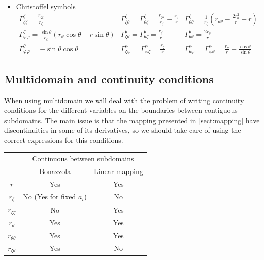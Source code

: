 \begin{itemize}
\begin{itemize}
\begin{equation}
\begin{array}{l}
\end{array}
\end{equation}
\end{itemize}
\item Christoffel symbols
\begin{equation}
\begin{array}{lll}
\displaystyle
\Gamma^{\zeta}_{\zeta\zeta}=\frac{r_{\zeta\zeta}}{r_\zeta}&
\displaystyle
\Gamma^{\zeta}_{\zeta\theta}=\Gamma^{\zeta}_{\theta\zeta}=
\frac{r_{\zeta\theta}}{r_\zeta}-\frac{r_\theta}{r}&
\displaystyle
\Gamma^{\zeta}_{\theta\theta}=\frac{1}{r_\zeta}\left(r_{\theta\theta}-
\frac{2r_\theta^2}{r}-r\right)\\
\displaystyle
\Gamma^{\zeta}_{\varphi\varphi}=\frac{\sin\theta}{r_\zeta}(r_\theta\cos\theta
-r\sin\theta)&
\displaystyle
\Gamma^{\theta}_{\zeta\theta}=\Gamma^{\theta}_{\theta\zeta}=\frac{r_\zeta}{r}&
\displaystyle
\Gamma^{\theta}_{\theta\theta}=\frac{2r_{\theta}}{r}\\
\displaystyle
\Gamma^{\theta}_{\varphi\varphi}=-\sin\theta\cos\theta&
\displaystyle
\Gamma^{\varphi}_{\zeta\varphi}=\Gamma^{\varphi}_{\varphi\zeta}=\frac{r_\zeta}{r}&
\displaystyle
\Gamma^{\varphi}_{\theta\varphi}=\Gamma^{\varphi}_{\varphi\theta}=\frac{r_\theta}{r}+
\frac{\cos\theta}{\sin\theta}
\end{array}
\end{equation}

\end{itemize}

\subsection{Multidomain and continuity conditions}

When using multidomain we will deal with the problem of writing continuity conditions for the different variables
on the boundaries between contiguous subdomains. The main issue is that the mapping presented in \ref{sect:mapping}
have discontinuities in some of its derivatives, so we should take care of using the correct expressions for
this conditions. 

\begin{center}
\begin{tabular}{c|c|c}
& \multicolumn{2}{c}{Continuous between subdomains} \\
& Bonazzola & Linear mapping \\
\hline
$r$ & Yes & Yes\\
$r_\zeta$ & No (Yes for fixed $a_i$) & No\\
$r_{\zeta\zeta}$ & No & Yes \\
$r_\theta$ & Yes & Yes \\
$r_{\theta\theta}$ & Yes & Yes \\
$r_{\zeta\theta}$ & Yes & No \\
\end{tabular}
\end{center}

